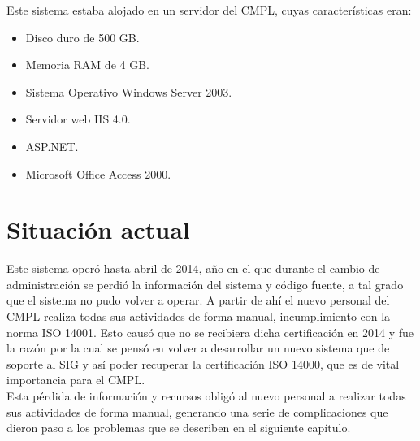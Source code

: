 	Este sistema estaba alojado en un servidor del CMPL, cuyas características eran:
	
	\begin{itemize}
		\item Disco duro de 500 GB.
		\item Memoria RAM de 4 GB.
		\item Sistema Operativo Windows Server 2003.
		\item Servidor web IIS 4.0.
		\item ASP.NET.
		\item Microsoft Office Access 2000.
	\end{itemize}
		
	\section{Situación actual}
	Este sistema operó hasta abril de 2014, año en el que durante el cambio de administración se perdió la información del sistema y código fuente, a  tal grado que el sistema no pudo volver a operar. A partir de ahí el nuevo personal del CMPL realiza todas sus actividades de forma manual, incumplimiento con la norma ISO 14001. Esto causó que no se recibiera dicha certificación en 2014 y fue la razón por la cual se pensó en volver a desarrollar un nuevo sistema que de soporte al SIG y así poder recuperar la certificación ISO 14000, que es de vital importancia para el CMPL.\\
	
	Esta pérdida de información y recursos obligó al nuevo personal a realizar todas sus actividades de forma manual, generando una serie de complicaciones que dieron paso a los problemas que se describen en el siguiente capítulo.
